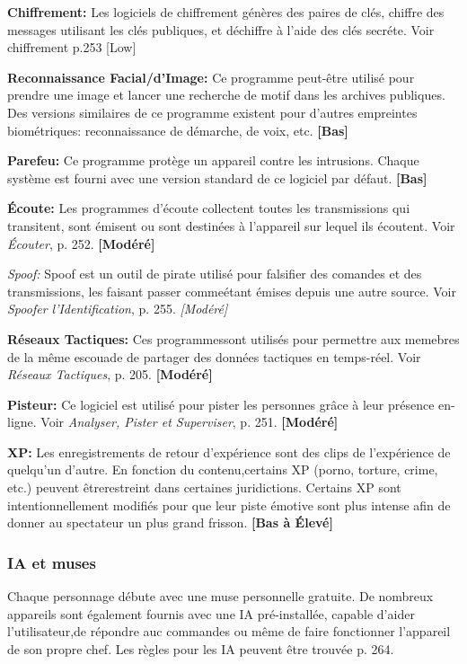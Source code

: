 \textbf{Chiffrement:} Les logiciels de chiffrement génères des paires de clés, chiffre des messages utilisant les clés publiques, et déchiffre à l'aide des clés secréte. Voir chiffrement p.253 [Low]

\textbf{Reconnaissance Facial/d'Image:} Ce programme peut-être utilisé pour prendre une image et lancer une recherche de motif dans les archives publiques. Des versions similaires de ce programme existent pour d'autres empreintes biométriques: reconnaissance de démarche, de voix, etc. \textbf{[Bas]} 

\textbf{Parefeu:} Ce programme protège un appareil contre les intrusions. Chaque système est fourni avec une version standard de ce logiciel par défaut. \textbf{[Bas]} 

\textbf{Écoute:} Les programmes d'écoute collectent toutes les transmissions qui transitent, sont émisent ou sont destinées à l'appareil sur lequel ils écoutent. Voir \emph{Écouter}, p. 252. \textbf{[Modéré]} 

\emph{Spoof:} Spoof est un outil de pirate utilisé pour falsifier des comandes et des transmissions, les faisant passer commeétant émises depuis une autre source. Voir \emph{Spoofer l'Identification}, p. 255. \emph{[Modéré]} 

\textbf{Réseaux Tactiques:} Ces programmessont utilisés pour permettre aux memebres de la même escouade de partager des données tactiques en temps-réel. Voir \emph{Réseaux Tactiques}, p. 205. \textbf{[Modéré]} 

\textbf{Pisteur:} Ce logiciel est utilisé pour pister les personnes grâce à leur présence en-ligne. Voir \emph{Analyser, Pister et Superviser}, p. 251. \textbf{[Modéré]} 

\textbf{XP:} Les enregistrements de retour d'expérience sont des clips de l'expérience de quelqu'un d'autre. En fonction du contenu,certains XP (porno, torture, crime, etc.) peuvent êtrerestreint dans certaines juridictions. Certains XP sont intentionnellement modifiés pour que leur piste émotive sont plus intense afin de donner au spectateur un plus grand frisson. \textbf{[Bas à Élevé]} 

\subsubsection{IA et muses} 

Chaque personnage débute avec une muse personnelle gratuite. De nombreux appareils sont également fournis avec une IA pré-installée, capable d'aider l'utilisateur,de répondre auc commandes ou même de faire fonctionner l'appareil de son propre chef. Les règles pour les IA peuvent être trouvée p. 264. 

